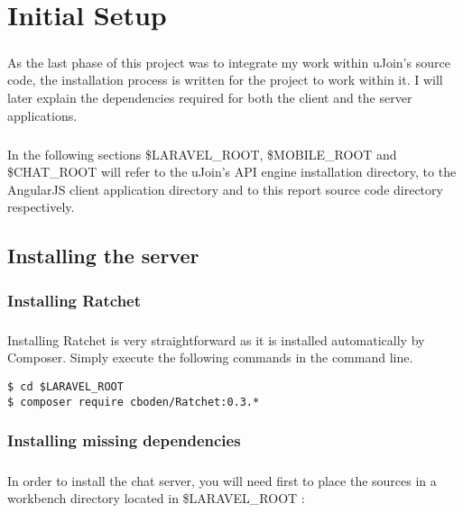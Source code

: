 \chapter{Initial Setup}

\paragraph{} As the last phase of this project was to integrate my work within 
uJoin's source code, the installation process is written for the project to 
work within it. I will later explain the dependencies required for both the 
client and the server applications.

\paragraph{} In the following sections \$LARAVEL\_ROOT, \$MOBILE\_ROOT and 
\$CHAT\_ROOT will refer to the uJoin's API engine installation directory, to 
the AngularJS client application directory and to this report source code 
directory respectively.

\section{Installing the server}

\subsection{Installing Ratchet}

\paragraph{} Installing Ratchet is very straightforward as it is installed 
automatically by Composer. Simply execute the following commands in the command 
line.

\begin{verbatim}
$ cd $LARAVEL_ROOT
$ composer require cboden/Ratchet:0.3.*
\end{verbatim}

\subsection{Installing missing dependencies}

\paragraph{} In order to install the chat server, you will need first to place 
the sources in a workbench directory located in \$LARAVEL\_ROOT :


